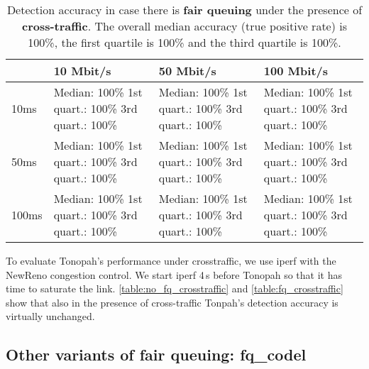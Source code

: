 \documentclass[conference]{IEEEtran}
\begin{document}
\begin{table}
\begin{tabularx}{\columnwidth}{| l | X | X | X |}
\hline
& 10 Mbit/s & 50 Mbit/s & 100 Mbit/s \\ \hline
10ms & Median: 100\% \newline 1st quart.: 100\% \newline 3rd quart.: 100\% & Median: 100\% \newline 1st quart.: 100\% \newline 3rd quart.: 100\% & Median: 100\% \newline 1st quart.: 100\% \newline 3rd quart.: 100\%\\ \hline
50ms & Median: 100\% \newline 1st quart.: 100\% \newline 3rd quart.: 100\% & Median: 100\% \newline 1st quart.: 100\% \newline 3rd quart.: 100\% & Median: 100\% \newline 1st quart.: 100\% \newline 3rd quart.: 100\% \\ \hline
100ms & Median: 100\% \newline 1st quart.: 100\% \newline 3rd quart.: 100\% & Median: 100\% \newline 1st quart.: 100\% \newline 3rd quart.: 100\% & Median: 100\% \newline 1st quart.: 100\% \newline 3rd quart.: 100\% \\ \hline
\end{tabularx}
\caption{Detection accuracy in case there is \textbf{fair queuing} under the presence of \textbf{cross-traffic}.  The overall median accuracy (true positive rate) is 100\%, the first quartile is 100\% and the third quartile is 100\%.}
\label{table:fq_crosstraffic}
\end{table}        

To evaluate Tonopah's performance under crosstraffic, we use iperf with the NewReno congestion control. We start iperf 4\,s before Tonopah so that it has time to saturate the link. 
\autoref{table:no_fq_crosstraffic} and \autoref{table:fq_crosstraffic} show that also in the presence of cross-traffic Tonpah's detection accuracy is virtually unchanged. 

\subsection{Other variants of fair queuing: fq\_codel}
\end{document}
